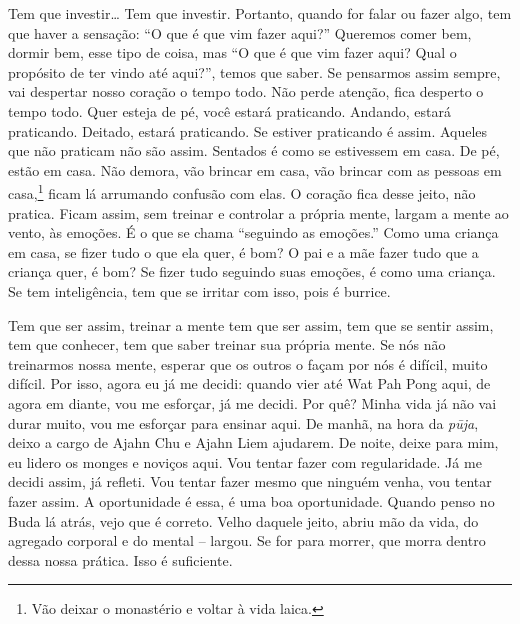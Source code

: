 Tem que investir\ldots{} Tem que investir. Portanto, quando for falar ou
fazer algo, tem que haver a sensação: “O que é que vim fazer aqui?”
Queremos comer bem, dormir bem, esse tipo de coisa, mas “O que é que
vim fazer aqui? Qual o propósito de ter vindo até aqui?”, temos que
saber. Se pensarmos assim sempre, vai despertar nosso coração o tempo
todo. Não perde atenção, fica desperto o tempo todo. Quer esteja de pé,
você estará praticando. Andando, estará praticando. Deitado, estará
praticando. Se estiver praticando é assim. Aqueles que não praticam não
são assim. Sentados é como se estivessem em casa. De pé, estão em casa.
Não demora, vão brincar em casa, vão brincar com as pessoas em
casa,\footnote{Vão deixar o monastério e voltar à vida laica.} ficam lá
arrumando confusão com elas. O coração fica desse jeito, não pratica.
Ficam assim, sem treinar e controlar a própria mente, largam a mente ao
vento, às emoções. É o que se chama “seguindo as emoções.” Como uma
criança em casa, se fizer tudo o que ela quer, é bom? O pai e a mãe
fazer tudo que a criança quer, é bom? Se fizer tudo seguindo suas
emoções, é como uma criança. Se tem inteligência, tem que se irritar
com isso, pois é burrice. 

Tem que ser assim, treinar a mente tem que ser assim, tem que se
sentir assim, tem que conhecer, tem que saber treinar sua própria
mente. Se nós não treinarmos nossa mente, esperar que os outros o façam
por nós é difícil, muito difícil. Por isso, agora eu já me decidi:
quando vier até Wat Pah Pong aqui, de agora em diante, vou me esforçar,
já me decidi. Por quê? Minha vida já não vai durar muito, vou me
esforçar para ensinar aqui. De manhã, na hora da \textit{pūja}, deixo
a cargo de Ajahn Chu e Ajahn Liem ajudarem. De noite, deixe para mim,
eu lidero os monges e noviços aqui. Vou tentar fazer com regularidade.
Já me decidi assim, já refleti. Vou tentar fazer mesmo que ninguém
venha, vou tentar fazer assim. A oportunidade é essa, é uma boa
oportunidade. Quando penso no Buda lá atrás, vejo que é correto. Velho
daquele jeito, abriu mão da vida, do agregado corporal e do mental –
largou. Se for para morrer, que morra dentro dessa nossa prática. Isso
é suficiente.

